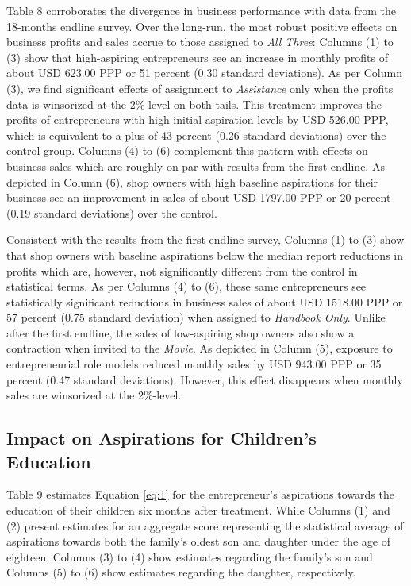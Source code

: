 \documentclass[11.5pt]{article}
\begin{document}
Table 8 corroborates the divergence in business performance with data from the 18-months endline survey. Over the long-run, the most robust positive effects on business profits and sales accrue to those assigned to \emph{All Three}: Columns (1) to (3) show that high-aspiring entrepreneurs see an increase in monthly profits of about USD 623.00 PPP or 51 percent (0.30 standard deviations). As per Column (3), we find significant effects of assignment to \emph{Assistance} only when the profits data is winsorized at the 2\%-level on both tails. This treatment improves the profits of entrepreneurs with high initial aspiration levels by USD 526.00 PPP, which is equivalent to a plus of 43 percent (0.26 standard deviations) over the control group. Columns (4) to (6) complement this pattern with effects on business sales which are roughly on par with results from the first endline. As depicted in Column (6), shop owners with high baseline aspirations for their business see an improvement in sales of about USD 1797.00 PPP or 20 percent (0.19 standard deviations) over the control.

Consistent with the results from the first endline survey, Columns (1) to (3) show that shop owners with baseline aspirations below the median report reductions in profits which are, however, not significantly different from the control in statistical terms. As per Columns (4) to (6), these same entrepreneurs see statistically significant reductions in business sales of about USD 1518.00 PPP or 57 percent (0.75 standard deviation) when assigned to \emph{Handbook Only}. %
Unlike after the first endline, the sales of low-aspiring shop owners also show a contraction when invited to the \emph{Movie}. As depicted in Column (5), exposure to entrepreneurial role models reduced monthly sales by USD 943.00 PPP or 35 percent (0.47 standard deviations). However, this effect disappears when monthly sales are winsorized at the 2\%-level. %

\subsection{Impact on Aspirations for Children's Education}

Table 9 estimates Equation \eqref{eq:1} for the entrepreneur's aspirations towards the education of their children six months after treatment. While Columns (1) and (2) present estimates for an aggregate score representing the statistical average of aspirations towards both the family's oldest son and daughter under the age of eighteen, Columns (3) to (4) show estimates regarding the family's son and Columns (5) to (6) show estimates regarding the daughter, respectively.
\end{document}
